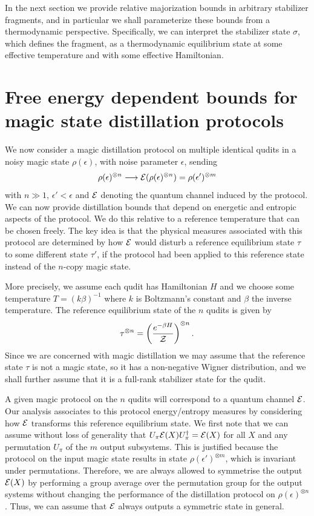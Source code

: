 \documentclass[pra,
aps,
twocolumn,
superscriptaddress,
groupedaddress,
nofootinbib,
reprint
]{revtex4-1}
\begin{document}
In the next section we provide relative majorization bounds in arbitrary stabilizer fragments, and in particular we shall parameterize these bounds from a thermodynamic perspective. Specifically, we can interpret the stabilizer state $\sigma$, which defines the fragment, as a thermodynamic equilibrium state at some effective temperature and with some effective Hamiltonian.

\newpage
\section{Free energy dependent bounds for magic state distillation protocols}
\label{sec:stab}

We now consider a magic distillation protocol on multiple identical qudits in a noisy magic state $\rho(\epsilon)$, with noise parameter $\epsilon$, sending 
\begin{equation}
\rho(\epsilon)^{\otimes n} \longrightarrow {\mathcal E}(\rho(\epsilon)^{\otimes n}) =\rho(\epsilon')^{\otimes m}
\end{equation}
with $n \gg 1$, $\epsilon' <\epsilon$ and ${\mathcal E}$ denoting the quantum channel induced by the protocol. We can now provide distillation bounds that depend on energetic and entropic aspects of the protocol. We do this relative to a reference temperature that can be chosen freely. The key idea is that the physical measures associated with this protocol are determined by how ${\mathcal E}$ would disturb a reference equilibrium state $\tau$ to some different state $\tau'$, if the protocol had been applied to this reference state instead of the $n$-copy magic state. 

More precisely, we assume each qudit has Hamiltonian $H$ and we choose some temperature $T = (k\beta)^{-1}$ where $k$ is Boltzmann's constant and $\beta$ the inverse temperature. The reference equilibrium state of the $n$ qudits is given by
\begin{equation}
\tau^{\otimes n} = \left ( \frac{e^{-\beta H}}{\mathcal{Z}} \right )  ^{\otimes n}.
\end{equation}
Since we are concerned with magic distillation we may assume that the reference state $\tau$ is not a magic state, so it has a non-negative Wigner distribution, and we shall further assume that it is a full-rank stabilizer state for the qudit. 

A given magic protocol on the $n$ qudits will correspond to a quantum channel ${\mathcal E}$. Our analysis associates to this protocol energy/entropy measures by considering how ${\mathcal E}$ transforms this reference equilibrium state. We first note that we can assume without loss of generality that $U_\pi{\mathcal E}(X) U_\pi^\dagger = {\mathcal E}(X)$ for all $X$ and any permutation $U_\pi$ of the $m$ output subsystems. This is justified because the protocol on the input magic state results in state $\rho(\epsilon')^{\otimes m}$, which is invariant under permutations. Therefore, we are always allowed to symmetrise the output ${\mathcal E}(X)$ by performing a group average over the permutation group for the output systems without changing the performance of the distillation protocol on $\rho(\epsilon)^{\otimes n}$. Thus, we can assume that ${\mathcal E}$ always outputs a symmetric state in general.
\end{document}
